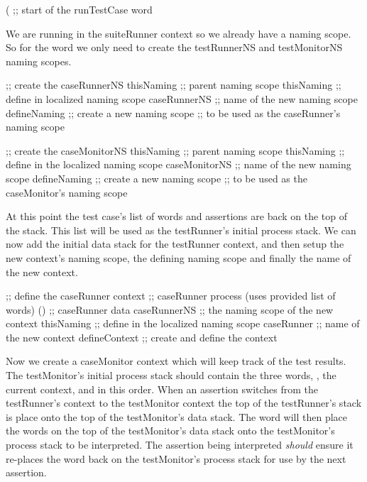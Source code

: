 
\startJoylolCode
(               ;; start of the runTestCase word
\stopJoylolCode

We are running in the suiteRunner context so we already have a 
 naming scope. So for the  word we only 
need to create the testRunnerNS and testMonitorNS naming scopes. 

\startJoylolCode
  ;; create the caseRunnerNS
  thisNaming   ;; parent naming scope
  thisNaming   ;; define in localized naming scope
  caseRunnerNS ;; name of the new naming scope
  defineNaming ;; create a new naming scope
               ;; to be used as the caseRunner's naming scope
\stopJoylolCode

\startJoylolCode
  ;; create the caseMonitorNS
  thisNaming    ;; parent naming scope
  thisNaming    ;; define in the localized naming scope
  caseMonitorNS ;; name of the new naming scope
  defineNaming  ;; create a new naming scope
                ;; to be used as the caseMonitor's naming scope
\stopJoylolCode

At this point the test case's list of words and assertions are back on the 
top of the stack. This list will be used as the testRunner's initial 
process stack. We can now add the initial data stack for the testRunner 
context, and then setup the new context's naming scope, the defining 
naming scope and finally the name of the new context.

\startJoylolCode
  ;; define the caseRunner context
                ;; caseRunner process (uses provided list of words)
  ()            ;; caseRunner data
  caseRunnerNS  ;; the naming scope of the new context
  thisNaming    ;; define in the localized naming scope
  caseRunner    ;; name of the new context
  defineContext ;; create and define the context
\stopJoylolCode

Now we create a caseMonitor context which will keep track of the test 
results. The testMonitor's initial process stack should contain the three 
words, , the current context, and  in this 
order. When an assertion switches from the testRunner's context to the 
testMonitor context the top of the testRunner's stack is place onto the 
top of the testMonitor's data stack. The  word will then 
place the words on the top of the testMonitor's data stack onto the 
testMonitor's process stack to be interpreted. The assertion being 
interpreted \emph{should} ensure it re-places the  word 
back on the testMonitor's process stack for use by the next assertion. 

